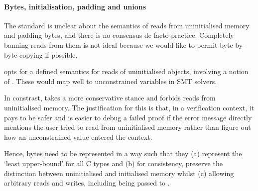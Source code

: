 \paragraph{Bytes, initialisation, padding and unions}%

The  standard is unclear about the semantics of reads from
uninitialised memory and padding bytes, and there is no consensus de facto
practice. Completely banning reads from them is not ideal because we would like
to permit byte-by-byte copying if possible.

 opts for a defined semantics for reads of uninitialised objects,
involving a notion of . These would map well to
unconstrained variables in SMT solvers.

In constrast,  takes a more conservative stance and forbids reads from
uninitialised memory. The justification for this is that, in a verification
context, it pays to be safer and is easier to debug a failed proof if the error
message directly mentions the user tried to read from uninitialised memory
rather than figure out how an unconstrained value entered the context.


Hence, bytes need to be represented in a way such that they (a) represent the
`least upper-bound' for all C types and (b) for consistency, preserve the
distinction between uninitialised and initialised memory whilst (c) allowing
arbitrary reads and writes, including being passed to .

